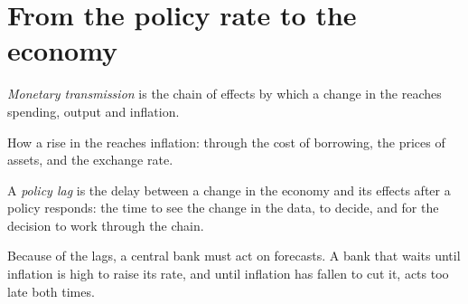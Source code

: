 \section{From the policy rate to the economy}\label{sec:g12:monetary-policy:transmission}

\begin{definition}\label{def:g12:monetary-policy:transmission}
\emph{Monetary transmission} is the chain of effects by which a change in the  reaches spending, output and inflation.
\end{definition}

\begin{omfigure}

{\small How a rise in the  reaches inflation: through the cost of borrowing, the prices of assets, and the exchange rate.}
\end{omfigure}

\begin{definition}\label{def:g12:monetary-policy:lag}
A \emph{policy lag} is the delay between a change in the economy and its effects after a policy responds: the time to see the change in the data, to decide,
and for the decision to work through the chain.
\end{definition}

Because of the lags, a central bank must act on forecasts. A bank that waits until inflation is high to raise its rate, and until inflation has fallen to cut it, acts
too late both times.

